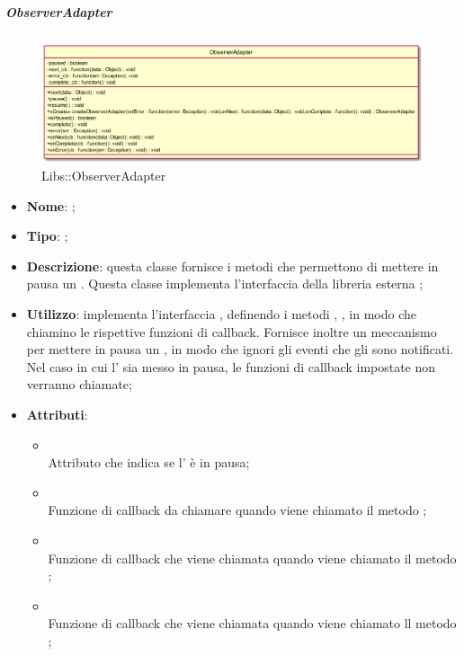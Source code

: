 \hypertarget{ObserverAdapter_label}{\subparagraph{ObserverAdapter}}
\begin{figure}[h]
	\centering
	\includegraphics[width=\textwidth,height=\textheight,keepaspectratio]{images/ClassObserverAdapter.png}
	\caption{Libs::ObserverAdapter}
\end{figure}
\begin{itemize}
	\item \textbf{Nome}: ;
	\item \textbf{Tipo}: ;
	\item \textbf{Descrizione}: questa classe fornisce i metodi che permettono di mettere in pausa un .
Questa classe implementa l'interfaccia della libreria esterna ;
	\item \textbf{Utilizzo}: implementa l'interfaccia , definendo i metodi , ,  in modo che chiamino le rispettive funzioni di callback. Fornisce inoltre un meccanismo per mettere in pausa un , in modo che ignori gli eventi che gli sono notificati. Nel caso in cui l' sia messo in pausa, le funzioni di callback impostate non verranno chiamate;
	\item \textbf{Attributi}:
	\begin{itemize}
		\item[]  \\
		Attributo che indica se l' è in pausa;
		\item[]  \\
		Funzione di callback da chiamare quando viene chiamato il metodo ;
		\item[]  \\
		Funzione di callback che viene chiamata quando viene chiamato il metodo ;
		\item[]  \\
		Funzione di callback che viene chiamata quando viene chiamato ll metodo ;

\end{itemize}
\end{itemize}
